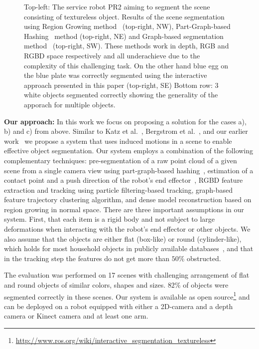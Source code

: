 \begin{figure}[ht]
\begin{tabular}{cccc}
\end{tabular}
\caption{Top-left: The service robot PR2 aiming to segment the scene
  consisting of textureless object. Results  of  the   scene segmentation
  using Region  Growing  method~\cite{RGBRegionGrowing} (top-right, NW), Part-Graph-based 
  Hashing~\cite{marton12SC} method (top-right, NE) and Graph-based  
  segmentation method~\cite{Felzenszwalb}   (top-right, SW). These methods work in depth, RGB and RGBD 
  space respectively and all underachieve due to the complexity of this challenging task. 
  On the other hand blue egg on the blue plate was correctly segmented using the interactive approach presented in this paper (top-right, SE)
  Bottom row: 3 white objects segmented correctly showing the generality of the apporach for multiple objects.}
\label{fig:tracking_dists}
\end{figure}

\textbf{Our approach:} In this work we focus on proposing a solution for the cases a), b) and c) from above.
Similar  to Katz  et al.~\cite{Katz-WS-MM-ICRA2011}, Bergstrom et
al.~\cite{bergstrom11icvs}, and our earlier
work~\cite{bersch12interactive} we propose a system that uses
induced motions  in a scene to enable effective
object  segmentation.   Our  system   employs  a  combination  of  the
following  complementary techniques: pre-segmentation of a raw point cloud of a given scene from a single camera
view using part-graph-based hashing~\cite{marton12SC}, estimation
of a contact  point and a push direction of the robot's end effector~\cite{bersch12interactive}, RGBD feature
extraction and tracking using particle filtering-based tracking, graph-based feature trajectory 
clustering algorithm, and dense model reconstruction based on region growing in normal space.
There are three important assumptions in our system. First, that each item is a rigid  body and not subject
to large deformations when  interacting with  the robot's  end  effector or
other objects. We also assume that the objects are either flat (box-like) or round (cylinder-like),
which holds for most household objects in publicly available databases~\cite{marton11ijrr}, and
that in the tracking step the features do not get more than $50\%$ obstructed.

The evaluation was performed on 17 scenes with challenging arrangement of flat and
round objects of similar colors, shapes and sizes. $82\%$ of objects
were segmented correctly in these scenes.  Our system   is
available  as open source\footnote{\url{http://www.ros.org/wiki/interactive_segmentation_textureless}}
and can  be deployed  on a  robot equipped with either a 2D-camera and a depth
camera or Kinect camera and at least one arm.

